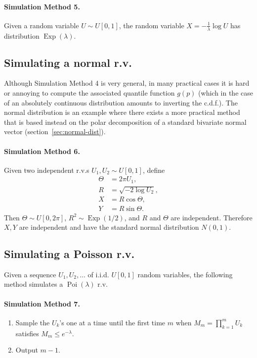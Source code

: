 \documentclass[12pt]{article}
\newcommand{\poissondist}{\operatorname{Poi}}
\newcommand{\expdist}{\operatorname{Exp}}
\theoremstyle{example}
\begin{document}
\paragraph{Simulation Method 5.} Given a random variable $U\sim U[0,1]$, the random variable $X = -\frac{1}{\lambda}\log U$ has distribution $\expdist(\lambda)$.

\subsection{Simulating a normal r.v.}

Although Simulation Method 4 is very general, in many practical cases it is hard or annoying to compute the associated quantile function $g(p)$ (which in the case of an absolutely continuous distribution amounts to inverting the c.d.f.). The normal distribution is an example where there exists a more practical method that is based instead on the polar decomposition of a standard bivariate normal vector (section~\ref{sec:normal-dist}).

\paragraph{Simulation Method 6.} Given two independent r.v.s $U_1,U_2 \sim U[0,1]$, define
\begin{align*}
\Theta &= 2\pi U_1, \\
R &= \sqrt{-2 \log U_2}, \\
X &= R\cos \Theta, \\
Y &= R \sin \Theta.
\end{align*}
Then $\Theta \sim U[0,2\pi]$, $R^2 \sim \expdist(1/2)$, and $R$ and $\Theta$ are independent. Therefore $X,Y$ are independent and have the standard normal distribution $N(0,1)$.


\subsection{Simulating a Poisson r.v.}

Given a sequence $U_1,U_2,\ldots $ of i.i.d. $U[0,1]$ random variables, the following method simulates a $\poissondist(\lambda)$ r.v.

\paragraph{Simulation Method 7.} 

\begin{enumerate}
\item Sample the $U_k$'s one at a time until the first time $m$ when $M_m =\prod_{k=1}^m U_k$ satisfies $M_m \le e^{-\lambda}$.
\item Output $m-1$.
\end{enumerate}
\end{document}
